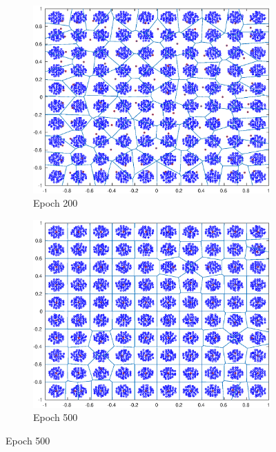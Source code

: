 \documentclass[10pt]{article}
\begin{document}
\begin{figure}[H]
\begin{subfigure}[b]{.45\textwidth}
    \includegraphics[width=\columnwidth]{NeuralGas_200.eps}
    \caption{Epoch 200}
  \end{subfigure}
  \quad
  \begin{subfigure}[b]{.45\textwidth}
    \includegraphics[width=\columnwidth]{NeuralGas_500.eps}
    \caption{Epoch 500}
  \end{subfigure}

  \label{fig2bng}
\end{figure}
\end{document}

